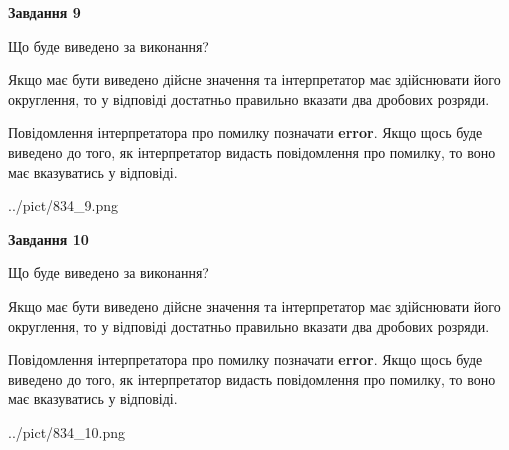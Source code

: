 \documentclass[12pt, ukrainian]{article}
\begin{document}
{\begin {Large}
{\begin {center}\textbf{Завдання 9}\end {center}}\par
Що буде виведено за виконання? \par

Якщо має бути виведено дійсне значення та інтерпретатор має здійснювати його округлення, 
то у відповіді достатньо правильно вказати два дробових розряди.

Повідомлення інтерпретатора про помилку позначати \textbf{error}.
Якщо щось буде виведено до того, як інтерпретатор видасть повідомлення про помилку, 
то воно має вказуватись у відповіді. \par

\begin{center}
	{../pict/834_9.png}
\end{center}
\newpage

{\begin {center}\textbf{Завдання 10}\end {center}}\par
Що буде виведено за виконання? \par

Якщо має бути виведено дійсне значення та інтерпретатор має здійснювати його округлення, 
то у відповіді достатньо правильно вказати два дробових розряди.

Повідомлення інтерпретатора про помилку позначати \textbf{error}.
Якщо щось буде виведено до того, як інтерпретатор видасть повідомлення про помилку, 
то воно має вказуватись у відповіді. \par

\begin{center}
	{../pict/834_10.png}
\end{center}
\newpage

\end {Large}}
\end{document}

